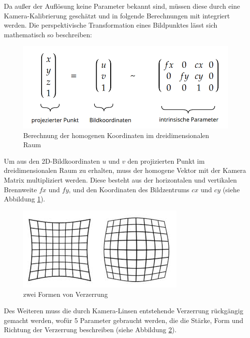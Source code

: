 \documentclass[12pt, ngerman]{article}
\begin{document}
Da außer der Auflösung keine Parameter bekannt sind, müssen diese durch eine Kamera-Kalibrierung geschätzt und in folgende Berechnungen mit integriert werden. Die perspektivische Transformation eines Bildpunktes lässt sich mathematisch so beschreiben:
\begin{figure}[hbtp!]
    \includegraphics[width=\textwidth]{camera_matrix.png}
    \caption{Berechnung der homogenen Koordinaten im dreidimensionalen Raum}
    \label{Abb: camera_matrix}
\end{figure}

Um aus den 2D-Bildkoordinaten $u$ und $v$ den projizierten Punkt im dreidimensionalen Raum zu erhalten, muss der homogene Vektor mit der Kamera Matrix multipliziert werden. Diese besteht aus der horizontalen und vertikalen Brennweite $fx$ und $fy$, und den Koordinaten des Bildzentrums $cx$ und $cy$ (siehe Abbildung \ref{Abb: camera_matrix}).

\begin{figure}
  \includegraphics[width=\linewidth]{distortion.jpeg}
  \caption{zwei Formen von Verzerrung}
  \label{Abb: distortion}
\end{figure}
Des Weiteren muss die durch Kamera-Linsen entstehende Verzerrung rückgängig gemacht werden, wofür 5 Parameter gebraucht werden, die die Stärke, Form und Richtung der Verzerrung beschreiben (siehe Abbildung \ref{Abb: distortion}).
\end{document}
